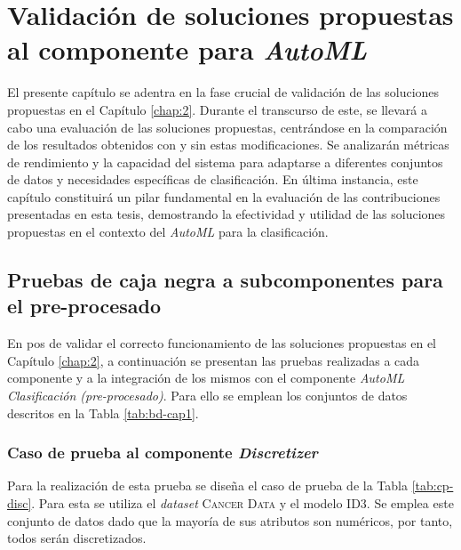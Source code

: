 \chapter{Validación de soluciones propuestas al componente para \textit{AutoML}}\label{chap:3}
El presente capítulo se adentra en la fase crucial de validación de las soluciones propuestas en el Capítulo \ref{chap:2}. Durante el transcurso de este, se llevará a cabo una evaluación de las soluciones propuestas, centrándose en la comparación de los resultados obtenidos con y sin estas modificaciones. Se analizarán métricas de rendimiento y la capacidad del sistema para adaptarse a diferentes conjuntos de datos y necesidades específicas de clasificación. En última instancia, este capítulo constituirá un pilar fundamental en la evaluación de las contribuciones presentadas en esta tesis, demostrando la efectividad y utilidad de las soluciones propuestas en el contexto del \textit{AutoML} para la clasificación.

\section{Pruebas de caja negra a subcomponentes para el pre-procesado}
En pos de validar el correcto funcionamiento de las soluciones propuestas en el Capítulo \ref{chap:2}, a continuación se presentan las pruebas realizadas a cada componente y a la integración de los mismos con el componente \textit{AutoML Clasificación (pre-procesado)}. Para ello se emplean los conjuntos de datos descritos en la Tabla \ref{tab:bd-cap1}.

\subsection{Caso de prueba al componente \textit{Discretizer}}

Para la realización de esta prueba se diseña el caso de prueba de la Tabla \ref{tab:cp-disc}. Para esta se utiliza el \textit{dataset} \textsc{Cancer Data} y el modelo ID3. Se emplea este conjunto de datos dado que la mayoría de sus atributos son numéricos, por tanto, todos serán discretizados.

